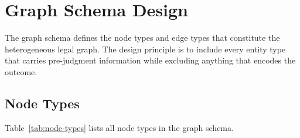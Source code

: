 \section{Graph Schema Design}
\label{sec:schema}

The graph schema defines the node types and edge types that constitute the heterogeneous legal graph. The design principle is to include every entity type that carries pre-judgment information while excluding anything that encodes the outcome.

\subsection{Node Types}

Table~\ref{tab:node-types} lists all node types in the graph schema.

